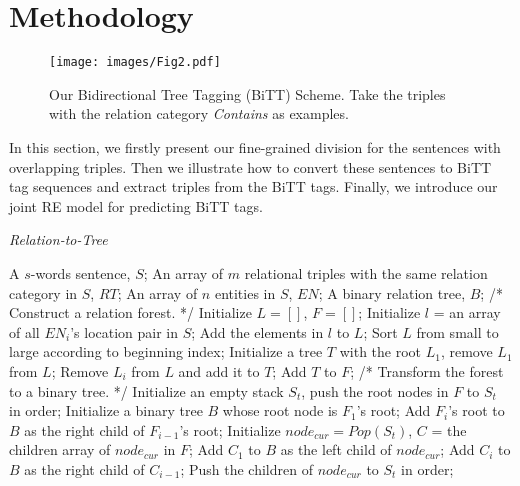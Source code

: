 \documentclass[conference]{IEEEtran}
\begin{document}
%
 \section{Methodology}

\begin{figure*}[t]
    \centering
    \texttt{[image: images/Fig2.pdf]}\\
    \caption{Our Bidirectional Tree Tagging (BiTT) Scheme. Take the triples with the relation category \emph{Contains} as examples.}
    \label{Fig:RelationsTreeTags}
\end{figure*}

In this section, we firstly present our fine-grained division for the sentences with overlapping triples. Then we illustrate how to convert these sentences to BiTT tag sequences and extract triples from the BiTT tags. Finally, we introduce our joint RE model for predicting BiTT tags.

\begin{algorithm}[tb]
    \caption{\emph{Relation-to-Tree}}
    \label{alg:turn}
    \begin{algorithmic}[1]
        \REQUIRE
            A $s$-words sentence, $S$;
            An array of $m$ relational triples with the same relation category in $S$, $RT$;
            An array of $n$ entities in $S$, $EN$;
        \ENSURE
            A binary relation tree, $B$;
        \STATE /* Construct a relation forest. */
        \STATE Initialize $L = []$, $F = []$;
            \STATE Initialize $l$ = an array of all $EN_i$'s location pair in $S$;
            \STATE Add the elements in $l$ to $L$;
        \ENDFOR
        \STATE Sort $L$ from small to large according to beginning index;
            \STATE Initialize a tree $T$ with the root $L_1$, remove $L_1$ from $L$;
                    \STATE Remove $L_i$ from $L$ and add it to $T$;
                \ENDIF
            \ENDFOR
            \STATE Add $T$ to $F$;
        \ENDWHILE
        \STATE /* Transform the forest to a binary tree. */
        \STATE Initialize an empty stack $S_t$, push the root nodes in $F$ to $S_t$ in order;
        \STATE Initialize a binary tree $B$ whose root node is $F_1$'s root;
            \STATE Add $F_i$'s root to $B$ as the right child of $F_{i-1}$'s root;
        \ENDFOR
            \STATE Initialize $node_{cur} = Pop(S_t)$, $C$ = the children array of $node_{cur}$ in $F$;
            \STATE Add $C_1$ to $B$ as the left child of $node_{cur}$;
                \STATE Add $C_i$ to $B$ as the right child of $C_{i-1}$;
            \ENDFOR
            \STATE Push the children of $node_{cur}$ to $S_t$ in order;
        \ENDWHILE
    \end{algorithmic}
\end{algorithm}
\end{document}
